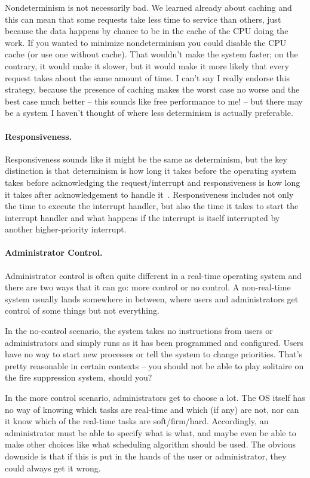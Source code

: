 Nondeterminism is not necessarily bad. We learned already about caching and this can mean that some requests take less time to service than others, just because the data happens by chance to be in the cache of the CPU doing the work. If you wanted to minimize nondeterminism you could disable the CPU cache (or use one without cache). That wouldn't make the system faster; on the contrary, it would make it slower, but it would make it more likely that every request takes about the same amount of time. I can't say I really endorse this strategy, because the presence of caching makes the worst case no worse and the best case much better -- this sounds like free performance to me! -- but there may be a system I haven't thought of where less determinism is actually preferable.

\paragraph{Responsiveness.} Responsiveness sounds like it might be the same as determinism, but the key distinction is that determinism is how long it takes before the operating system takes before acknowledging the request/interrupt and responsiveness is how long it takes after acknowledgement to handle it~\cite{osi}. Responsiveness includes not only the time to execute the interrupt handler, but also the time it takes to start the interrupt handler and what happens if the interrupt is itself interrupted by another higher-priority interrupt.

\paragraph{Administrator Control.} Administrator control is often quite different in a real-time operating system and there are two ways that it can go: more control or no control. A non-real-time system usually lands somewhere in between, where users and administrators get control of some things but not everything.

In the no-control scenario, the system takes no instructions from users or administrators and simply runs as it has been programmed and configured. Users have no way to start new processes or tell the system to change priorities. That's pretty reasonable in certain contexts -- you should not be able to play solitaire on the fire suppression system, should you?

In the more control scenario, administrators get to choose a lot. The OS itself has no way of knowing which tasks are real-time and which (if any) are not, nor can it know which of the real-time tasks are soft/firm/hard. Accordingly, an administrator must be able to specify what is what, and maybe even be able to make other choices like what scheduling algorithm should be used. The obvious downside is that if this is put in the hands of the user or administrator, they could always get it wrong. 

